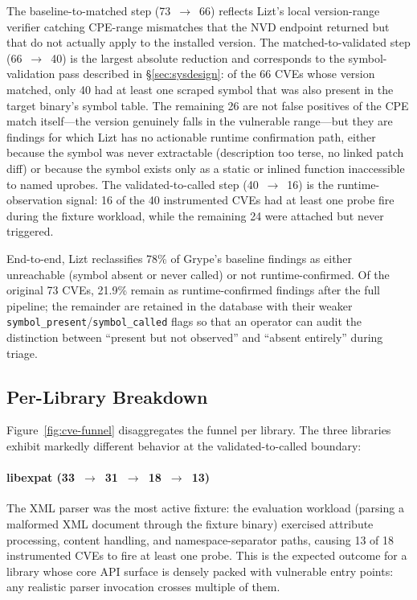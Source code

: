 \documentclass[conference]{IEEEtran}
\begin{document}
The baseline-to-matched step (73~$\to$~66) reflects Lizt's local version-range verifier catching CPE-range mismatches that the NVD endpoint returned but that do not actually apply to the installed version. The matched-to-validated step (66~$\to$~40) is the largest absolute reduction and corresponds to the symbol-validation pass described in \S\ref{sec:sysdesign}: of the 66 CVEs whose version matched, only 40 had at least one scraped symbol that was also present in the target binary's symbol table. The remaining 26 are not false positives of the CPE match itself---the version genuinely falls in the vulnerable range---but they are findings for which Lizt has no actionable runtime confirmation path, either because the symbol was never extractable (description too terse, no linked patch diff) or because the symbol exists only as a static or inlined function inaccessible to named uprobes. The validated-to-called step (40~$\to$~16) is the runtime-observation signal: 16 of the 40 instrumented CVEs had at least one probe fire during the fixture workload, while the remaining 24 were attached but never triggered.

End-to-end, Lizt reclassifies 78\% of Grype's baseline findings as either unreachable (symbol absent or never called) or not runtime-confirmed. Of the original 73 CVEs, 21.9\% remain as runtime-confirmed findings after the full pipeline; the remainder are retained in the database with their weaker \texttt{symbol\_present}/\texttt{symbol\_called} flags so that an operator can audit the distinction between ``present but not observed'' and ``absent entirely'' during triage.

\subsection{Per-Library Breakdown}

Figure~\ref{fig:cve-funnel} disaggregates the funnel per library. The three libraries exhibit markedly different behavior at the validated-to-called boundary:

\paragraph{libexpat (33~$\to$~31~$\to$~18~$\to$~13)}
The XML parser was the most active fixture: the evaluation workload (parsing a malformed XML document through the fixture binary) exercised attribute processing, content handling, and namespace-separator paths, causing 13 of 18 instrumented CVEs to fire at least one probe. This is the expected outcome for a library whose core API surface is densely packed with vulnerable entry points: any realistic parser invocation crosses multiple of them.
\end{document}
